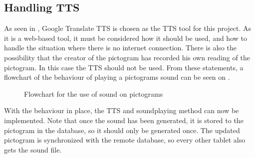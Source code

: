 \subsection{Handling TTS}%
As seen in , Google Translate TTS is chosen as the TTS tool for this project. As it is a web-based tool, it must be considered how it should be used, and how to handle the situation where there is no internet connection. There is also the possibility that the creator of the pictogram has recorded his own reading of the pictogram. In this case the TTS should not be used. From these statements, a flowchart of the behaviour of playing a pictograms sound can be seen on .

\begin{savenotes}
\begin{figure}[h]
\caption{Flowchart for the use of sound on pictograms}
\label{fig:soundflow}
\end{figure}
\end{savenotes}

With the behaviour in place, the TTS and soundplaying method can now be implemented. Note that once the sound has been generated, it is stored to the pictogram in the database, so it should only be generated once. The updated pictogram is synchronized with the remote database, so every other tablet also gets the sound file.